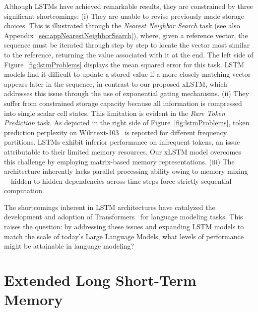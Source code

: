 Although LSTMs have achieved remarkable results, they are constrained by three significant shortcomings: (i) They are unable to revise previously made storage choices. This is illustrated through the {\it Nearest Neighbor Search} task (see also Appendix~\ref{sec:appNearestNeighborSearch}), where, given a reference vector, the sequence must be iterated through step by step to locate the vector most similar to the reference, returning the value associated with it at the end. The left side of Figure~\ref{fig:lstmProblems} displays the mean squared error for this task. LSTM models find it difficult to update a stored value if a more closely matching vector appears later in the sequence, in contrast to our proposed xLSTM, which addresses this issue through the use of exponential gating mechanisms. (ii) They suffer from constrained storage capacity because all information is compressed into single scalar cell states. This limitation is evident in the {\it Rare Token Prediction} task. As depicted in the right side of Figure~\ref{fig:lstmProblems}, token prediction perplexity on Wikitext-103~\citep{Merity:17} is reported for different frequency partitions. LSTMs exhibit inferior performance on infrequent tokens, an issue attributable to their limited memory resources. Our xLSTM model overcomes this challenge by employing matrix-based memory representations. (iii) The architecture inherently lacks parallel processing ability owing to memory mixing—hidden-to-hidden dependencies across time steps force strictly sequential computation.

The shortcomings inherent in LSTM architectures have catalyzed the development and adoption of Transformers~\citep{Vaswani:17} for language modeling tasks. This raises the question: by addressing these issues and expanding LSTM models to match the scale of today's Large Language Models, what levels of performance might be attainable in language modeling?

\section{Extended Long Short-Term Memory}
\label{sec:xLSTM}

